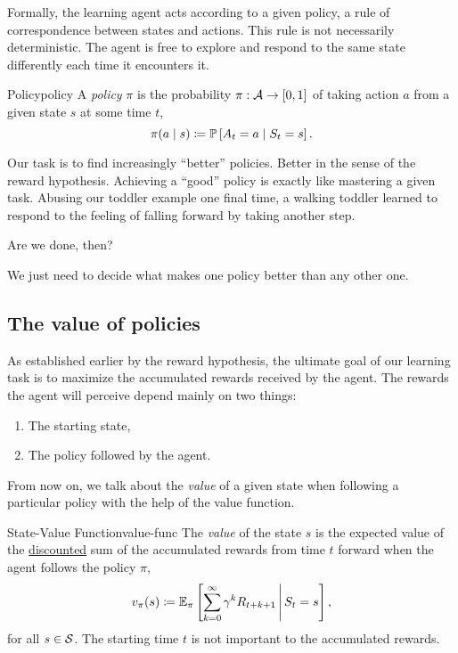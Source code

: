 Formally, the learning agent acts according to a given policy, a rule of
correspondence between states and actions. This rule is not necessarily
deterministic. The agent is free to explore and respond to the same state
differently each time it encounters it.

\begin{dfn}{Policy}{policy}
	A \emph{policy} $\pi$ is the probability $\pi: \mathcal{A} \to [0,1]$ of taking
	action $a$ from a given state $s$ at some time $t$,
	\[
		\pi(a \mid s) \coloneqq \mathbb{P}\left[A_t = a \mid S_t = s\right].
	\]
\end{dfn}

Our task is to find increasingly ``better'' policies. Better in the sense of the
reward hypothesis. Achieving a ``good'' policy is exactly like mastering a given
task. Abusing our toddler example one final time, a walking toddler learned to
respond to the feeling of falling forward by taking another step.

Are we done, then? 

We just need to decide what makes one policy better than any other one.

\subsection{The value of policies}

As established earlier by the reward hypothesis, the ultimate goal of our
learning task is to maximize the accumulated rewards received by the agent. The
rewards the agent will perceive depend mainly on two things:
\begin{enumerate}
	\item The starting state,
	\item The policy followed by the agent.
\end{enumerate}

From now on, we talk about the \textit{value} of a given state when following a
particular policy with the help of the value function.

\begin{dfn}{State-Value Function}{value-func}
	The \emph{value} of the state $s$ is the expected value of the
	\underline{discounted} sum of the accumulated rewards from time $t$ forward
	when the agent follows the policy $\pi$,
	\[
		v_{\pi} (s) \coloneqq \mathbb{E}_{\pi} \left[\sum_{k=0}^{\infty} \gamma^{k} R_{t+k+1} \,\middle\vert\, S_{t} = s\right],
	\]
	for all $s \in \mathcal{S}$. The starting time $t$ is not important to the
	accumulated rewards.
\end{dfn}

